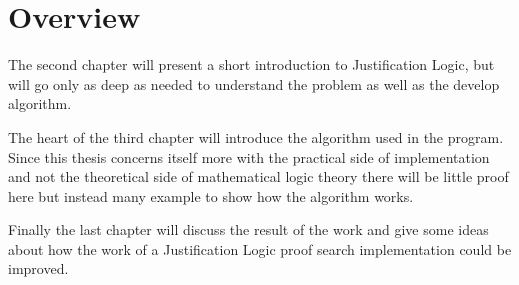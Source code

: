 \section{Overview}
The second chapter will present a short introduction to Justification Logic, but will go only as deep as needed to understand the problem as well as the develop algorithm.
\par
The heart of the third chapter will introduce the algorithm used in the  program. Since this thesis concerns itself more with the practical side of implementation and not the theoretical side of mathematical logic theory there will be little proof here but instead many example to show how the algorithm works.
\par
Finally the last chapter will discuss the result of the work and give some ideas about how the work of a Justification Logic proof search implementation could be improved. 